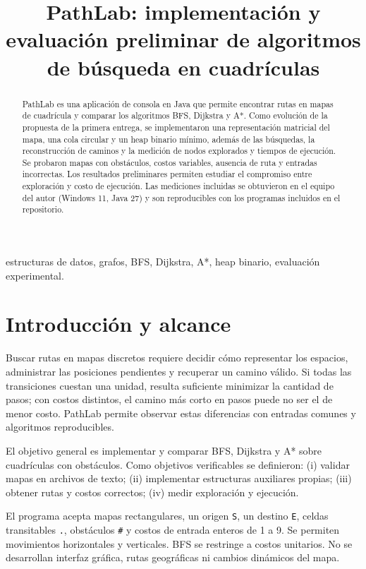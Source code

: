 \documentclass[conference]{IEEEtran}
\title{PathLab: implementaci\'on y evaluaci\'on preliminar de algoritmos de b\'usqueda en cuadr\'iculas}
\author{\IEEEauthorblockN{Alfrek Arthur Pinto Garc\'ia}
\IEEEauthorblockA{Universidad Nacional de Colombia, Sede Bogot\'a\\
Bogot\'a D. C., Colombia\\
Correo institucional: \texttt{abadillop@unal.edu.co}}}
\begin{document}
\maketitle
\begin{abstract}
PathLab es una aplicaci\'on de consola en Java que permite encontrar rutas en mapas de cuadr\'icula y comparar los algoritmos BFS, Dijkstra y A*. Como evoluci\'on de la propuesta de la primera entrega, se implementaron una representaci\'on matricial del mapa, una cola circular y un heap binario m\'inimo, adem\'as de las b\'usquedas, la reconstrucci\'on de caminos y la medici\'on de nodos explorados y tiempos de ejecuci\'on. Se probaron mapas con obst\'aculos, costos variables, ausencia de ruta y entradas incorrectas. Los resultados preliminares permiten estudiar el compromiso entre exploraci\'on y costo de ejecuci\'on. Las mediciones incluidas se obtuvieron en el equipo del autor (Windows 11, Java 27) y son reproducibles con los programas incluidos en el repositorio.
\end{abstract}
\begin{IEEEkeywords}
estructuras de datos, grafos, BFS, Dijkstra, A*, heap binario, evaluaci\'on experimental.
\end{IEEEkeywords}

\section{Introducci\'on y alcance}
Buscar rutas en mapas discretos requiere decidir c\'omo representar los espacios, administrar las posiciones pendientes y recuperar un camino v\'alido. Si todas las transiciones cuestan una unidad, resulta suficiente minimizar la cantidad de pasos; con costos distintos, el camino m\'as corto en pasos puede no ser el de menor costo. PathLab permite observar estas diferencias con entradas comunes y algoritmos reproducibles.

El objetivo general es implementar y comparar BFS, Dijkstra y A* sobre cuadr\'iculas con obst\'aculos. Como objetivos verificables se definieron: (i) validar mapas en archivos de texto; (ii) implementar estructuras auxiliares propias; (iii) obtener rutas y costos correctos; (iv) medir exploraci\'on y ejecuci\'on.

El programa acepta mapas rectangulares, un origen \texttt{S}, un destino \texttt{E}, celdas transitables \texttt{.}, obst\'aculos \texttt{\#} y costos de entrada enteros de 1 a 9. Se permiten movimientos horizontales y verticales. BFS se restringe a costos unitarios. No se desarrollan interfaz gr\'afica, rutas geogr\'aficas ni cambios din\'amicos del mapa.
\end{document}
